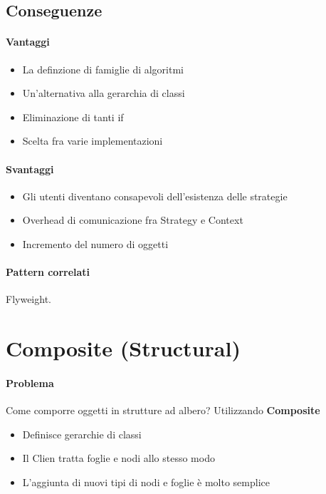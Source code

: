 \subsection*{Conseguenze}
\paragraph*{Vantaggi}
\begin{itemize}
    \item La definzione di famiglie di algoritmi
    \item Un'alternativa alla gerarchia di classi
    \item Eliminazione di tanti if
    \item Scelta fra varie implementazioni
\end{itemize}
\paragraph*{Svantaggi}
\begin{itemize}
    \item Gli utenti diventano consapevoli dell'esistenza delle strategie
    \item Overhead di comunicazione fra Strategy e Context
    \item Incremento del numero di oggetti
\end{itemize}
\paragraph*{Pattern correlati} Flyweight.
\section{Composite (Structural)}
\paragraph*{Problema} Come comporre oggetti in strutture ad albero?
Utilizzando \textbf{Composite}
\begin{itemize}
    \item Definisce gerarchie di classi
    \item Il Clien tratta foglie e nodi allo stesso modo
    \item L'aggiunta di nuovi tipi di nodi e foglie è molto semplice
\end{itemize}
